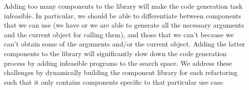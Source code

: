 \documentclass[sigconf]{acmart}
\begin{document}
Adding too many components to the library will
make the code generation task infeasible. In particular, we should
be able to differentiate between components that we can use
(we have or we are able to generate
all the necessary arguments and the current object for calling them), and those
that we can't because we can't obtain some of the arguments
and/or the current object. Adding the latter components to the library will
significantly slow down the code generation process by
adding infeasible programs to the search space.
We address these challenges by dynamically building the component library for each refactoring
such that it only contains components specific to that particular use case.






\end{document}
